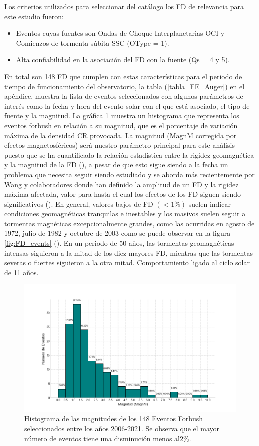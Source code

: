 Los criterios utilizados para seleccionar del catálogo los FD de relevancia para este estudio fueron:
\begin{itemize}
    \item Eventos cuyas fuentes son Ondas de Choque Interplanetarias OCI y Comienzos de tormenta súbita SSC (OType = 1).
    \item Alta confiabilidad en la asociación del FD con la fuente (Qs = 4 y 5).
\end{itemize}
En total son 148 FD que cumplen con estas características para el periodo de tiempo de funcionamiento del observatorio, la tabla (\ref{tabla_FE_Auger}) en el apéndice, muestra la lista de eventos seleccionados con algunos parámetros de interés como la fecha y hora del evento solar con el que está asociado, el tipo de fuente y la magnitud.
La gráfica \ref{hist_FE} muestra un histograma que representa los eventos forbush  en relación a su magnitud, que es el porcentaje de variación máxima de la densidad CR provocada. La magnitud (MagnM corregida por efectos magnetosféricos) será nuestro parámetro principal para este análisis puesto que se ha cuantificado la relación estadística entre la rigidez geomagnética y la magnitud de la FD (\cite{belov_2009}), a pesar de que esto sigue siendo a la fecha un problema que necesita seguir siendo estudiado y se aborda más recientemente por Wang y colaboradores  donde han definido la amplitud de un FD y la rigidez máxima afectada, valor para hasta el cual los efectos de los FD siguen siendo significativos (\cite{wang_2023}). En general, valores bajos de FD $(<1\%)$ suelen indicar condiciones geomagnéticas tranquilas e inestables y los masivos suelen seguir a tormentas magnéticas excepcionalmente grandes, como las ocurridas en agosto de 1972, julio de 1982 y octubre de 2003 como se puede observar en la figura \ref{fig:FD_events} (\cite{belov_2009}).  En un periodo de 50 años, las tormentas geomagnéticas intensas siguieron a la mitad de los diez mayores FD, mientras que las tormentas severas o fuertes siguieron a la otra mitad. Comportamiento ligado al ciclo solar de 11 años.
\begin{figure}
    \includegraphics[width=1\linewidth]{Figs/Figr/CRI_FD_HISTOGRAMA.png}
    \caption{Histograma de las magnitudes de los 148 Eventos Forbush seleccionados entre los años 2006-2021. Se observa que el mayor número de eventos tiene una disminución menos al$2\%$.}
    \label{hist_FE}
\end{figure}
